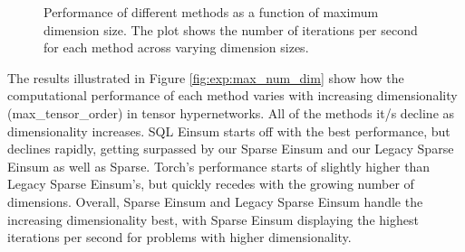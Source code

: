 \begin{figure}[H]
    \caption{Performance of different methods as a function of maximum dimension size.
        The plot shows the number of iterations per second for each method across varying dimension sizes.}
    \label{fig:exp:max_dim_size}
\end{figure}

\noindent
The results illustrated in Figure \ref{fig:exp:max_num_dim} show how the computational performance
of each method varies with increasing dimensionality (max\_tensor\_order) in tensor hypernetworks.
All of the methods it/s decline as dimensionality increases. SQL Einsum starts off with the
best performance, but declines rapidly, getting surpassed by our Sparse Einsum and our Legacy Sparse
Einsum as well as Sparse. Torch's performance starts of slightly higher than Legacy Sparse Einsum's,
but quickly recedes with the growing number of dimensions. Overall, Sparse Einsum and Legacy Sparse
Einsum handle the increasing dimensionality best, with Sparse Einsum displaying the highest iterations
per second for problems with higher dimensionality.

